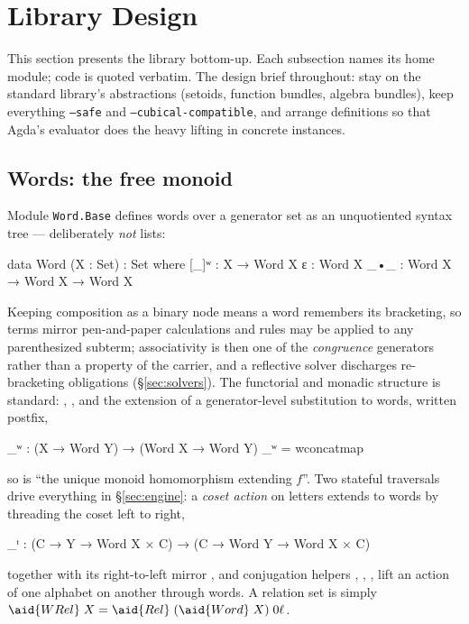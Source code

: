 \section{Library Design}\label{sec:design}

This section presents the library bottom-up.  Each subsection names its
home module; code is quoted verbatim.  The design brief throughout: stay on
the standard library's abstractions (setoids, function bundles, algebra
bundles), keep everything \texttt{--safe} and
\texttt{--cubical-compatible}, and arrange definitions so that Agda's
evaluator does the heavy lifting in concrete instances.

\subsection{Words: the free monoid}\label{sec:words}

Module \texttt{Word.Base} defines words over a generator set as an
unquotiented syntax tree --- deliberately \emph{not} lists:

\begin{agdacode}
data Word (X : Set) : Set where
  [_]ʷ : X → Word X
  ε    : Word X
  _•_  : Word X → Word X → Word X
\end{agdacode}

Keeping composition as a binary node means a word remembers its
bracketing, so terms mirror pen-and-paper calculations and rules may be
applied to any parenthesized subterm; associativity is then one of the
\emph{congruence} generators rather than a property of the carrier, and a
reflective solver discharges re-bracketing obligations
(\S\ref{sec:solvers}).  The functorial and monadic structure is standard:
, , and the extension of a generator-level
substitution to words, written postfix,

\begin{agdacode}
_ʷ : (X → Word Y) → (Word X → Word Y)
_ʷ = wconcatmap
\end{agdacode}

so  is ``the unique monoid homomorphism extending $f$''.  Two
stateful traversals drive everything in \S\ref{sec:engine}: a \emph{coset
action} on letters extends to words by threading the coset left to right,

\begin{agdacode}
_ᵗ : (C → Y → Word X × C) → (C → Word Y → Word X × C)
\end{agdacode}

together with its right-to-left mirror , and conjugation
helpers , , ,  lift an
action of one alphabet on another through words.  A relation set is simply
$\aid{WRel}\;X = \aid{Rel}\;(\aid{Word}\;X)\;0\ell$.

